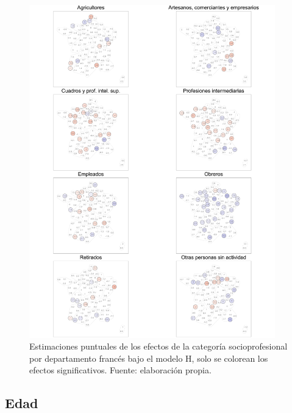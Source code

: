 \begin{figure}[H]
	\centering
	\includegraphics[width = 0.95\textwidth]{Figs/Efectos/Dorling_Efectos_Cat_Socioprof_Modelo_H}
	\caption{Estimaciones puntuales de los efectos de la categoría socioprofesional por departamento francés bajo el modelo H, solo se colorean los efectos significativos. Fuente: elaboración propia.}
	\label{fig:Dorling_Efectos_Cat_Socioprof}
\end{figure}

\subsection{Edad}

